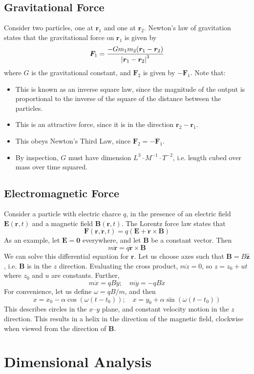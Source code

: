 \documentclass{article}
\begin{document}
\subsection{Gravitational Force}
Consider two particles, one at $\bm r_1$ and one at $\bm r_2$. Newton's law of gravitation states that the gravitational force on $\bm r_1$ is given by
\[ \bm F_1 = \frac{- G m_1 m_2 (\bm r_1 - \bm r_2)}{\abs{\bm r_1 - \bm r_2}^3} \]
where $G$ is the gravitational constant, and $\bm F_2$ is given by $-\bm F_1$. Note that:
\begin{itemize}
    \item This is known as an inverse square law, since the magnitude of the output is proportional to the inverse of the square of the distance between the particles.
    \item This is an attractive force, since it is in the direction $\bm r_2 - \bm r_1$.
    \item This obeys Newton's Third Law, since $\bm F_2 = - \bm F_1$.
    \item By inspection, $G$ must have dimension $L^3 \cdot M^{-1} \cdot T^{-2}$, i.e. length cubed over mass over time squared.
\end{itemize}

\subsection{Electromagnetic Force}
Consider a particle with electric charce $q$, in the presence of an electric field $\bm E(\bm r, t)$ and a magnetic field $\bm B(\bm r, t)$. The Lorentz force law states that
\[ \bm F(\bm r, \dot{\bm r}, t) = q\left( \bm E + \dot{\bm r} \times \bm B \right) \]
As an example, let $\bm E = \bm 0$ everywhere, and let $\bm B$ be a constant vector. Then
\[ m \ddot{\bm r} = q \dot{\bm r} \times \bm B \]
We can solve this differential equation for $\bm r$. Let us choose axes such that $\bm B = B \hat{\bm z}$, i.e. $\bm B$ is in the $z$ direction. Evaluating the cross product, $m \ddot{z} = 0$, so $z = z_0 + ut$ where $z_0$ and $u$ are constants. Further,
\[ m \ddot x = qB\dot y;\quad m \ddot y = -qB\dot x \]
For convenience, let us define $\omega = qB/m$, and then
\[ x = x_0 - \alpha \cos(\omega(t - t_0));\quad x = y_0 + \alpha \sin(\omega(t - t_0)) \]
This describes circles in the $x$--$y$ plane, and constant velocity motion in the $z$ direction. This results in a helix in the direction of the magnetic field, clockwise when viewed from the direction of $\bm B$.

\section{Dimensional Analysis}
\end{document}
